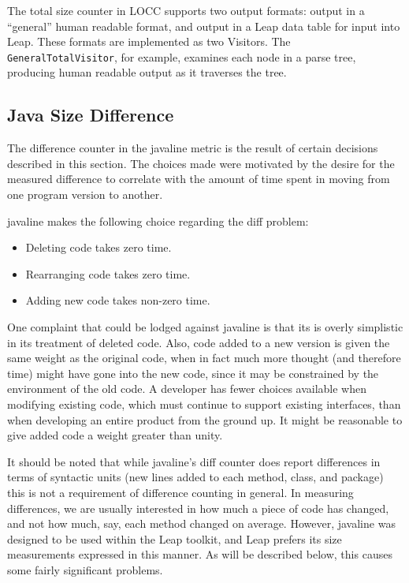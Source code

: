 The total size counter in LOCC supports two output formats: output in
a ``general'' human readable format, and output in a Leap data table
for input into Leap.  These formats are implemented as two Visitors.
The {\tt GeneralTotalVisitor}, for example, examines each node in a
parse tree, producing human readable output as it traverses the tree.


\subsection{Java Size Difference}

The difference counter in the {\sc javaline} metric is the result of
certain decisions described in this section.  The choices made were
motivated by the desire for the measured difference to correlate with the
amount of time spent in moving from one program version to another.

{\sc javaline} makes the following choice regarding the diff problem:

\begin{itemize}

\item Deleting code takes zero time.

\item Rearranging code takes zero time.

\item Adding new code takes non-zero time.

\end{itemize}

One complaint that could
be lodged against {\sc javaline} is that its is overly simplistic in its
treatment of deleted code.  Also, code added to a new version is given 
the same weight as the original code, when in fact much more thought
(and therefore time) might have gone into the new code, since it may
be constrained by the environment of the old code.  A developer has
fewer choices available when modifying existing code, which must
continue to support existing interfaces, than when developing an
entire product from the ground up.  It might be
reasonable to give added code a weight greater than unity.

It should be noted that while {\sc javaline}'s diff counter
does report differences in terms of syntactic units (new lines added
to each method, class, and package) this is not a requirement of
difference counting in general.  In measuring differences, we are usually
interested in how much a piece of code has changed, and not how much,
say, each method changed on average.  However, {\sc javaline} was designed
to be used within the Leap toolkit\cite{Johnson}, and Leap prefers its size 
measurements expressed in this manner.  As will be described below, this
causes some fairly significant problems.


